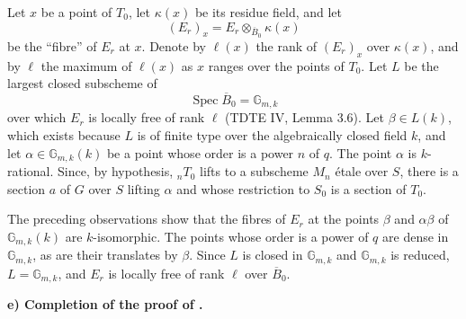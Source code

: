 
Let \(x\) be a point of \(T_0\), let \(\kappa(x)\) be its residue
field, and let
\[
  (E_r)_x=E_r\otimes_{\overline B_0}\kappa(x)
\]
be the ``fibre'' of \(E_r\) at \(x\). Denote by \(\ell(x)\) the rank
of \((E_r)_x\) over \(\kappa(x)\), and by \(\ell\) the maximum of
\(\ell(x)\) as \(x\) ranges over the points of \(T_0\). Let \(L\) be
the largest closed subscheme of
\[
  \operatorname{Spec}\overline B_0=\mathbb G_{m,k}
\]
over which \(E_r\) is locally free of rank \(\ell\) (TDTE IV, Lemma
3.6). Let \(\beta\in L(k)\), which exists because \(L\) is of finite
type over the algebraically closed field \(k\), and let
\(\alpha\in\mathbb G_{m,k}(k)\) be a point whose order is a power
\(n\) of \(q\). The point \(\alpha\) is \(k\)-rational. Since, by
hypothesis, \({}_nT_0\) lifts to a subscheme \(M_n\) étale over \(S\),
there is a section \(a\) of \(G\) over \(S\) lifting \(\alpha\) and
whose restriction to \(S_0\) is a section of \(T_0\).

The preceding observations show that the fibres of \(E_r\) at the
points \(\beta\) and \(\alpha\beta\) of \(\mathbb G_{m,k}(k)\) are
\(k\)-isomorphic. The points whose order is a power of \(q\) are dense
in \(\mathbb G_{m,k}\), as are their translates by \(\beta\). Since
\(L\) is closed in \(\mathbb G_{m,k}\) and \(\mathbb G_{m,k}\) is
reduced, \(L=\mathbb G_{m,k}\), and \(E_r\) is locally free of rank
\(\ell\) over \(\overline B_0\).

\medskip\noindent\textbf{e) Completion of the proof of .}

